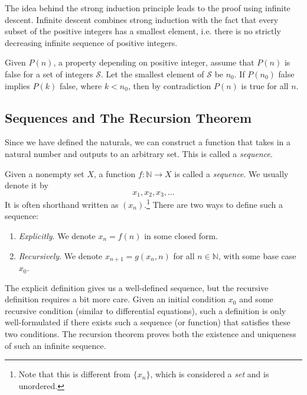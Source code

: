   The idea behind the strong induction principle leads to the proof using infinite descent. Infinite descent combines strong induction with the fact that every subset of the positive integers has a smallest element, i.e. there is no strictly decreasing infinite sequence of positive integers. 

  \begin{theorem}
    Given $P(n)$, a property depending on positive integer, assume that $P(n)$ is false for a set of integers $\mathcal{S}$. Let the smallest element of $\mathcal{S}$ be $n_0$. If $P(n_0)$ false implies $P(k)$ false, where $k < n_0$, then by contradiction $P(n)$ is true for all $n$. 
  \end{theorem} 

\subsection{Sequences and The Recursion Theorem}

  Since we have defined the naturals, we can construct a function that takes in a natural number and outputs to an arbitrary set. This is called a \textit{sequence}. 

  \begin{definition}[Sequence]
    \label{def:sequence}
    Given a nonempty set $X$, a function $f: \mathbb{N} \rightarrow X$ is called a \textit{sequence}. We usually denote it by 
    \begin{equation}
      x_1, x_2, x_3, \ldots
    \end{equation}
    It is often shorthand written as $(x_n)$.\footnote{Note that this is different from $\{x_n\}$, which is considered a \textit{set} and is unordered.} There are two ways to define such a sequence: 
    \begin{enumerate}
      \item \textit{Explicitly}. We denote $x_n = f(n)$ in some closed form. 
      \item \textit{Recursively}. We denote $x_{n+1} = g(x_n, n)$ for all $n \in \mathbb{N}$, with some base case $x_0$. 
    \end{enumerate}
  \end{definition}

  The explicit definition gives us a well-defined sequence, but the recursive definition requires a bit more care. Given an initial condition $x_0$ and some recursive condition (similar to differential equations), such a definition is only well-formulated if there exists such a sequence (or function) that satisfies these two conditions. The recursion theorem proves both the existence and uniqueness of such an infinite sequence. 


